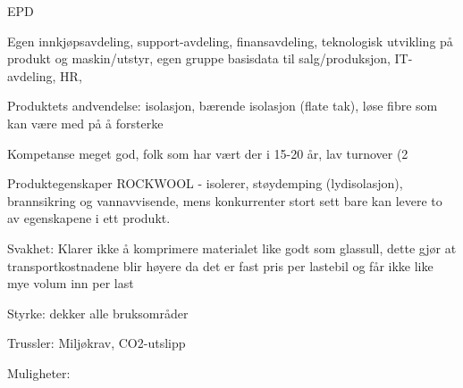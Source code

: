 EPD

Egen innkjøpsavdeling, support-avdeling, finansavdeling, teknologisk utvikling på produkt og maskin/utstyr, egen gruppe basisdata til salg/produksjon, IT-avdeling, HR, 

Produktets andvendelse: isolasjon, bærende isolasjon (flate tak), løse fibre som kan være med på å forsterke

Kompetanse meget god, folk som har vært der i 15-20 år, lav turnover (2%

Produktegenskaper ROCKWOOL - isolerer, støydemping (lydisolasjon), brannsikring og vannavvisende, mens konkurrenter stort sett bare kan levere to av egenskapene i ett produkt. 

Svakhet: Klarer ikke å komprimere materialet like godt som glassull, dette gjør at transportkostnadene blir høyere da det er fast pris per lastebil og får ikke like mye volum inn per last 

Styrke: dekker alle bruksområder

Trussler: Miljøkrav, CO2-utslipp

Muligheter: 


